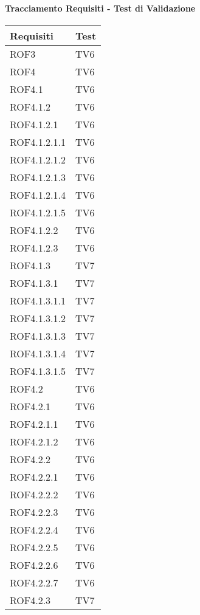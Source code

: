 \paragraph{Tracciamento Requisiti - Test di Validazione}
\begin{center}
\begin{longtable}{|p{7cm}|p{7cm}|}
\toprule
\textbf{Requisiti} & \textbf{Test}\\
\midrule
ROF3 & TV6\\
\midrule
ROF4 & TV6\\
\midrule
ROF4.1 & TV6\\
\midrule
ROF4.1.2 & TV6\\
\midrule
ROF4.1.2.1 & TV6\\
\midrule
ROF4.1.2.1.1 & TV6\\
\midrule
ROF4.1.2.1.2 & TV6\\
\midrule
ROF4.1.2.1.3 & TV6\\
\midrule
ROF4.1.2.1.4 & TV6\\
\midrule
ROF4.1.2.1.5 & TV6\\
\midrule
ROF4.1.2.2 & TV6\\
\midrule
ROF4.1.2.3 & TV6\\
\midrule
ROF4.1.3 & TV7\\
\midrule
ROF4.1.3.1 & TV7\\
\midrule
ROF4.1.3.1.1 & TV7\\
\midrule
ROF4.1.3.1.2 & TV7\\
\midrule
ROF4.1.3.1.3 & TV7\\
\midrule
ROF4.1.3.1.4 & TV7\\
\midrule
ROF4.1.3.1.5 & TV7\\
\midrule
ROF4.2 & TV6\\
\midrule
ROF4.2.1 & TV6\\
\midrule
ROF4.2.1.1 & TV6\\
\midrule
ROF4.2.1.2 & TV6\\
\midrule
ROF4.2.2 & TV6\\
\midrule
ROF4.2.2.1 & TV6\\
\midrule
ROF4.2.2.2 & TV6\\
\midrule
ROF4.2.2.3 & TV6\\
\midrule
ROF4.2.2.4 & TV6\\
\midrule
ROF4.2.2.5 & TV6\\
\midrule
ROF4.2.2.6 & TV6\\
\midrule
ROF4.2.2.7 & TV6\\
\midrule
ROF4.2.3 & TV7\\
\midrule

\end{longtable}
\end{center}

